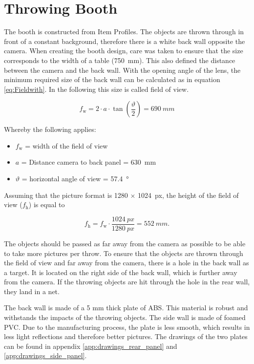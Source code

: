\section{Throwing Booth}
\label{sec:booth}
The booth is constructed from Item Profiles.
The objects are thrown through in front of a constant background, therefore there is a white back wall opposite the camera.
When creating the booth design, care was taken to ensure that the size corresponds to the width of a table (\SI{750}{mm}).
This also defined the distance between the camera and the back wall.
With the opening angle of the lens, the minimum required size of the back wall can be calculated as in equation \ref{eq:Fieldwith}. 
In the following this size is called field of view.

\begin{equation}
	f_\text{w} = 2 \cdot a \cdot \tan\left( \frac{\vartheta}{2}\right) = \SI{690}{mm}
	\label{eq:Fieldwith}
\end{equation}

Whereby the following applies:
\begin{itemize}
	\item $f_\text{w}$ = width of the field of view
	\item $a$ = Distance camera to back panel = \SI{630}{mm}
	\item $\vartheta$ = horizontal angle of view = \SI{57.4}{\degree} \cite{baumer_lense}
\end{itemize}

Assuming that the picture format is 1280 $\times$ \SI{1024}{px}, the height of the field of view ($f_\text{h}$) is equal to

\begin{equation}
	f_\text{h} = f_\text{w} \cdot \frac{\SI{1024}{px}}{\SI{1280}{px}} = \SI{552}{mm}.
	\label{eq:Fieldhight}
\end{equation}

The objects should be passed as far away from the camera as possible to be able to take more pictures per throw.
To ensure that the objects are thrown through the field of view and far away from the camera, there is a hole in the back wall as a target.
It is located on the right side of the back wall, which is further away from the camera.
If the throwing objects are hit through the hole in the rear wall, they land in a net.

The back wall is made of a 5 mm thick plate of ABS.
This material is robust and withstands the impacts of the throwing objects.
The side wall is made of foamed PVC.
Due to the manufacturing process, the plate is less smooth, which results in less light reflections and therefore better pictures.
The drawings of the two plates can be found in appendix \ref{app:drawings_rear_panel} and \ref{app:drawings_side_panel}.

